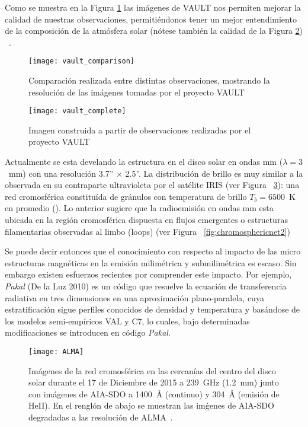Como se muestra en la Figura \ref{fig:vault_compare} las im\'agenes de VAULT nos permiten mejorar la calidad de nuestras observaciones, permiti\'endonos tener un mejor entendimiento de la composici\'on de la atm\'osfera solar (n\'otese tambi\'en la calidad de la Figura \ref{fig:vault_complete}) ~\citep{VAULT1}.

\begin{figure}[ht]
\centering
\texttt{[image: vault\_comparison]}
\caption{Comparaci\'on realizada entre distintas observaciones, mostrando la resoluci\'on de las im\'agenes tomadas por el proyecto VAULT}
\label{fig:vault_compare}
\end{figure}

\begin{figure}[ht]
\centering
\texttt{[image: vault\_complete]}
\caption{Imagen construida a partir de observaciones realizadas por el proyecto VAULT}
\label{fig:vault_complete}
\end{figure}

Actualmente se esta develando la estructura en el disco solar en ondas mm ($\lambda=3$~mm) con una resoluci\'on 3.7'' $\times$ 2.5''\citep{2018A&A...619L...6N}. La distribuci\'on de brillo es muy similar a la observada en su contraparte ultravioleta por el sat\'elite IRIS (ver Figura ~\ref{fig:chromosphericnet1}): una red cromosf\'erica constitu\'ida de gr\'anulos con temperatura de brillo $T_{b}=6500$~K en promedio (\citep{2018A&A...619L...6N}). Lo anterior sugiere que la radioemisi\'on en ondas mm esta  ubicada en la regi\'on cromosf\'erica dispuesta en flujos emergentes o estructuras filamentarias observadas al limbo (loops) (ver Figura ~\ref{fig:chromosphericnet2})

Se puede decir entonces que el conocimiento con respecto al impacto de las micro estructuras magn\'eticas en la emisi\'on milim\'etrica y submilim\'etrica es escaso. Sin embargo existen esfuerzos recientes por comprender este impacto. Por ejemplo, \emph{Pakal} (De la Luz 2010) es un c\'odigo que resuelve la ecuaci\'on de transferencia radiativa en tres dimensiones en una aproximaci\'on plano-paralela, cuya estratificaci\'on sigue perfiles conocidos de densidad y temperatura y bas\'andose de los modelos semi-emp\'iricos VAL y C7, lo cuales, bajo determinadas modificaciones se introducen en c\'odigo \emph{Pakal}.

\begin{figure}[ht]
\centering
\texttt{[image: ALMA]}
\caption{Im\'agenes de la red cromosf\'erica en las cercan\'ias del centro del disco solar durante el 17 de Diciembre de 2015 a 239~GHz (1.2~mm) junto con im\'agenes de AIA-SDO a 1400~$\mbox{\AA}$ (continuo) y 304~$\mbox{\AA}$ (emisi\'on de HeII). En el rengl\'on de abajo se muestran las im\'genes de AIA-SDO degradadas a las resoluci\'on de ALMA~\citep{2017A&A...605A..78A}.}
\label{fig:chromosphericnet1}
\end{figure}

